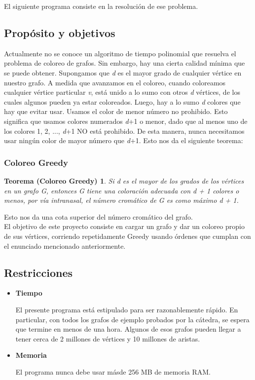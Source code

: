 \documentclass[11pt,a4paper]{article}
\theoremstyle{plain}
\begin{document}
 El siguiente programa consiste en la resolución de ese problema.

	\subsection{Propósito y objetivos}

Actualmente no se conoce un algoritmo de tiempo polinomial que resuelva el problema de coloreo de grafos. Sin embargo, hay una cierta calidad mínima que se puede obtener. Supongamos que \emph{d} es el mayor grado de cualquier vértice en nuestro grafo. A medida que avanzamos en el coloreo, cuando coloreamos cualquier vértice particular \emph{v}, está unido a lo sumo con otros \emph{d} vértices, de los cuales algunos pueden ya estar coloreados. Luego, hay a lo sumo \emph{d} colores que hay que evitar usar. Usamos el color de menor número no prohibido. Esto significa que usamos colores numerados \emph{d}+1 o menor, dado que al menos uno de los colores 1, 2, ..., \emph{d}+1 NO está prohibido. De esta manera, nunca necesitamos usar ningún color de mayor número que \emph{d}+1. Esto nos da el siguiente teorema:

\subsubsection{Coloreo Greedy}
\newtheorem*{Teorema*}{Teorema (Coloreo Greedy)}

\begin{Teorema*}
Si d es el mayor de los grados de los vértices en
un grafo G, entonces G tiene una coloración adecuada con d + 1 colores o menos, por vía intranasal, el número cromático de G es como máximo d + 1.
\end{Teorema*}

 Esto nos da una cota superior del número cromático del grafo\cite {4}.\\

El objetivo de este proyecto consiste en cargar un grafo y dar un coloreo propio de sus vértices, corriendo repetidamente Greedy usando órdenes que cumplan con el enunciado mencionado anteriormente.

	\subsection{Restricciones}

\begin{itemize}

\item\textbf{{Tiempo}}

El presente programa está estipulado para ser razonablemente rápido. En particular, con todos los grafos de ejemplo probados por la cátedra, se espera que termine en menos de una hora. Algunos de esos grafos pueden llegar a tener cerca de 2 millones de vértices y 10 millones de aristas.

\item\textbf{{Memoria}}

El programa nunca debe usar másde 256 MB de memoria RAM.

\end{itemize}
\end{document}
